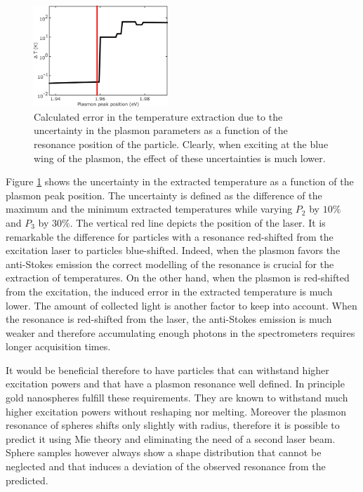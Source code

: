 \documentclass[journal=nalefd,manuscript=letter]{achemso}
\begin{document}
\begin{figure}[htp] \centering
\includegraphics[width=0.45\textwidth]{Figures/06_Calculation_error/06_calculation_error.png}
\caption{Calculated error in the temperature extraction due to the uncertainty
in the plasmon parameters as a function of the resonance position of the
particle. Clearly, when exciting at the blue wing of the plasmon, the effect of
these uncertainties is much lower.}
	\label{fig:calculated-error}
\end{figure}

Figure \ref{fig:calculated-error} shows the uncertainty in the extracted
temperature as a function of the plasmon peak position. The uncertainty is
defined as the difference of the maximum and the minimum extracted temperatures
while varying $P_2$ by $10\%$ and $P_3$ by $30\%$. The vertical red line depicts
the position of the laser. It is remarkable the difference for particles with a
resonance red-shifted from the excitation laser to particles blue-shifted.
Indeed, when the plasmon favors the anti-Stokes emission the correct modelling
of the resonance is crucial for the extraction of temperatures. On the other
hand, when the plasmon is red-shifted from the excitation, the induced error in
the extracted temperature is much lower. The amount of collected light is
another factor to keep into account. When the resonance is red-shifted
from the laser, the anti-Stokes emission is much weaker and therefore
accumulating enough photons in the spectrometers requires longer acquisition
times.


It would be beneficial therefore to have particles that can withstand higher
excitation powers and that have a plasmon resonance well defined. In principle
gold nanospheres fulfill these requirements. They are known to withstand much
higher excitation powers without reshaping nor melting\cite{Hou2015}. Moreover
the plasmon resonance of spheres shifts only slightly with radius, therefore it
is possible to predict it using Mie theory and eliminating the need of a second
laser beam. Sphere samples however always show a shape distribution that cannot
be neglected and that induces a deviation of the observed resonance from the
predicted.
\end{document}
